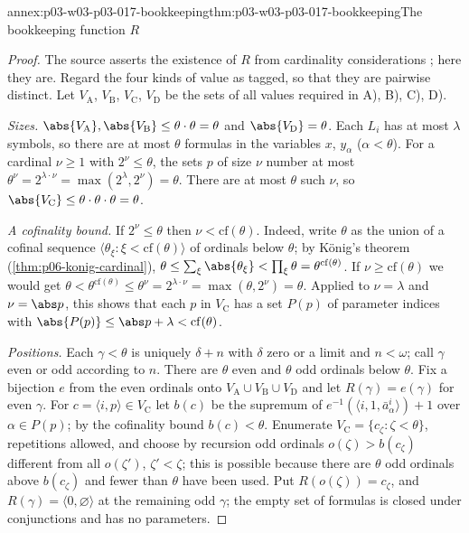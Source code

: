 \begin{annexitem}{annex:p03-w03-p03-017-bookkeeping}{thm:p03-w03-p03-017-bookkeeping}{The bookkeeping function \(R\)}
\begin{proof}
The source asserts the existence of \(R\) from cardinality considerations
\cite[p.~230]{Shelah1971Ultrapowers}; here they are.  Regard the four kinds
of value as tagged, so that they are pairwise distinct.  Let \(V_{\mathrm A}\),
\(V_{\mathrm B}\), \(V_{\mathrm C}\), \(V_{\mathrm D}\) be the sets of all values
required in A), B), C), D).

\emph{Sizes.}  \(\abs{V_{\mathrm A}},\abs{V_{\mathrm B}}\le\theta\cdot\theta=\theta\)
and \(\abs{V_{\mathrm D}}=\theta\).  Each \(L_i\) has at most \(\lambda\)
symbols, so there are at most \(\theta\) formulas in the variables \(x\),
\(y_\alpha\) (\(\alpha<\theta\)).  For a cardinal \(\nu\ge1\) with
\(2^\nu\le\theta\), the sets \(p\) of size \(\nu\) number at most
\(\theta^\nu=2^{\lambda\cdot\nu}=\max(2^\lambda,2^\nu)=\theta\).  There are at
most \(\theta\) such \(\nu\), so \(\abs{V_{\mathrm C}}\le\theta\cdot\theta\cdot
\theta=\theta\).

\emph{A cofinality bound.}  If \(2^\nu\le\theta\) then
\(\nu<\mathrm{cf}(\theta)\).  Indeed, write \(\theta\) as the union of a
cofinal sequence \(\langle\theta_\xi:\xi<\mathrm{cf}(\theta)\rangle\) of
ordinals below \(\theta\); by K\"onig's theorem
(\cref{thm:p06-konig-cardinal}),
\(\theta\le\sum_\xi\abs{\theta_\xi}<\prod_\xi\theta=\theta^{\mathrm{cf}(\theta)}\).
If \(\nu\ge\mathrm{cf}(\theta)\) we would get
\(\theta<\theta^{\mathrm{cf}(\theta)}\le\theta^\nu=2^{\lambda\cdot\nu}=
\max(\theta,2^\nu)=\theta\).  Applied to \(\nu=\lambda\) and \(\nu=\abs p\),
this shows that each \(p\) in \(V_{\mathrm C}\) has a set \(P(p)\) of parameter
indices with \(\abs{P(p)}\le\abs p+\lambda<\mathrm{cf}(\theta)\).

\emph{Positions.}  Each \(\gamma<\theta\) is uniquely \(\delta+n\) with
\(\delta\) zero or a limit and \(n<\omega\); call \(\gamma\) even or odd
according to \(n\).  There are \(\theta\) even and \(\theta\) odd ordinals
below \(\theta\).  Fix a bijection \(e\) from the even ordinals onto
\(V_{\mathrm A}\cup V_{\mathrm B}\cup V_{\mathrm D}\) and let \(R(\gamma)=e(\gamma)\)
for even \(\gamma\).  For \(c=\langle i,p\rangle\in V_{\mathrm C}\) let \(b(c)\)
be the supremum of \(e^{-1}(\langle i,1,\bar a^i_\alpha\rangle)+1\) over
\(\alpha\in P(p)\); by the cofinality bound \(b(c)<\theta\).  Enumerate
\(V_{\mathrm C}=\{c_\zeta:\zeta<\theta\}\), repetitions allowed, and choose by
recursion odd ordinals \(o(\zeta)>b(c_\zeta)\) different from all
\(o(\zeta')\), \(\zeta'<\zeta\); this is possible because there are
\(\theta\) odd ordinals above \(b(c_\zeta)\) and fewer than \(\theta\) have
been used.  Put \(R(o(\zeta))=c_\zeta\), and \(R(\gamma)=\langle0,
\varnothing\rangle\) at the remaining odd \(\gamma\); the empty set of
formulas is closed under conjunctions and has no parameters.


\end{proof}
\end{annexitem}
